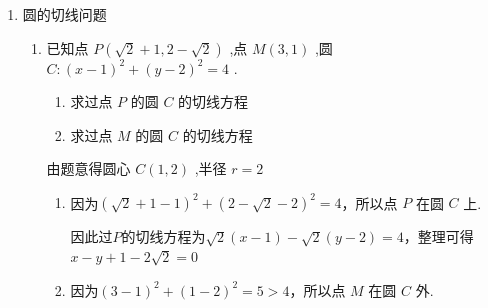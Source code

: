 \begin{enumerate}
\begin{enumerate}
        \begin{jieda}
            圆化为标准方程：${\left( x + 1\right) }^{2} + {\left( y - 3\right) }^{2} = 4$，圆心为(-1,3),半径为 $r = 2$
            
            因为 $\left| {AB}\right|  = 2\sqrt{3}$ ,所以圆心到直线的距离为 $d = \sqrt{{2}^{2} - {\left( \sqrt{3}\right) }^{2}} = 1$
            综上,所求直线的方程为 ${3x} + {4y} - 4 = 0$ 或 $x = 0$.
        \end{jieda}

    \end{enumerate}
    \item 圆的切线问题
    \begin{enumerate}
        \item 已知点 $P\left( {\sqrt{2} + 1,2 - \sqrt{2}}\right)$ ,点 $M\left( {3,1}\right)$ ,圆 $C : {\left( x - 1\right) }^{2} + {\left( y - 2\right) }^{2} = 4$ .
        \begin{enumerate}
            \item 求过点 $P$ 的圆 $C$ 的切线方程
            \item 求过点 $M$ 的圆 $C$ 的切线方程
        \end{enumerate}
        \begin{jieda}
            由题意得圆心 $C\left( {1,2}\right)$ ,半径 $r = 2$
            \begin{enumerate}
                \item 因为${\left( \sqrt{2} + 1 - 1\right) }^{2} + {\left( 2 - \sqrt{2} - 2\right) }^{2} = 4$，所以点 $P$ 在圆 $C$ 上.

                因此过$P$的切线方程为$\sqrt{2}\left( x - 1\right) -\sqrt{2}\left( y - 2\right) = 4$，整理可得$x - y + 1 - 2\sqrt{2} = 0$
                \item 因为${\left( 3 - 1\right) }^{2} + {\left( 1 - 2\right) }^{2} = 5 > 4$，所以点 $M$ 在圆 $C$ 外.
\end{enumerate}
\end{jieda}
\end{enumerate}
\end{enumerate}
